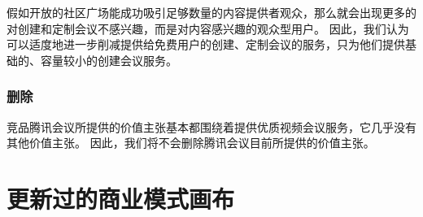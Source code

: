 \documentclass[a4paper,12pt]{article}
\begin{document}
    假如开放的社区广场能成功吸引足够数量的内容提供者观众，那么就会出现更多的对创建和定制会议不感兴趣，而是对内容感兴趣的观众型用户。
    因此，我们认为可以适度地进一步削减提供给免费用户的创建、定制会议的服务，只为他们提供基础的、容量较小的创建会议服务。


    \subsubsection{删除}

    竞品腾讯会议所提供的价值主张基本都围绕着提供优质视频会议服务，它几乎没有其他价值主张。
    因此，我们将不会删除腾讯会议目前所提供的价值主张。


    


\section{更新过的商业模式画布}


    
\end{document}
